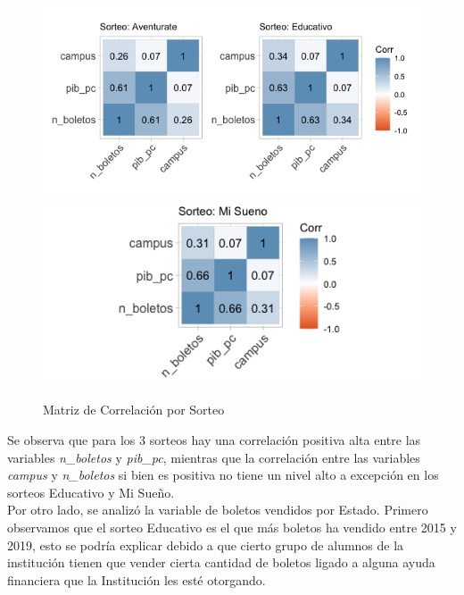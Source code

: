 \begin{figure}[H]
    \caption{Matriz de Correlación por Sorteo}
    \label{fig:corplot}
    \includegraphics[scale = 0.4]{Imagenes/cp1.png} \\
    \includegraphics[scale = 0.5]{Imagenes/cp2.png} \\
    \centering
\end{figure} 

Se observa que para los 3 sorteos hay una correlación positiva alta entre las variables \textit{n\_boletos} y \textit{pib\_pc}, mientras que la correlación entre las variables \textit{campus} y \textit{n\_boletos} si bien es positiva no tiene un nivel alto a excepción en los sorteos Educativo y Mi Sueño. \\

Por otro lado, se analizó la variable de boletos vendidos por Estado. Primero observamos que el sorteo Educativo es el que más boletos ha vendido entre 2015 y 2019, esto se podría explicar debido a que cierto grupo de alumnos de la institución tienen que vender cierta cantidad de boletos ligado a alguna ayuda financiera que la Institución les esté otorgando.
    
